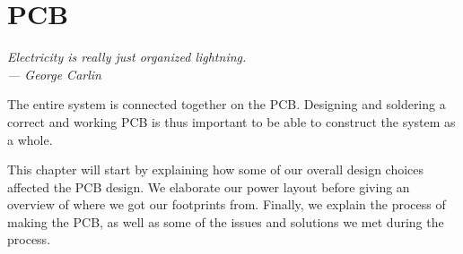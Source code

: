 \chapter{PCB}\label{ch:pcb}

\begin{flushright}{\slshape
    Electricity is really just organized lightning.\\ \medskip
    --- George Carlin}
\end{flushright}


The entire system is connected together on the PCB. Designing and soldering
a correct and working PCB is thus important to be able to construct the system
as a whole.

This chapter will start by explaining how some of our overall design choices
affected the PCB design. We elaborate our power layout before giving an
overview of where we got our footprints from. Finally, we explain the process 
of making the PCB, as well as some of the issues and solutions we met during 
the process.



%



%



